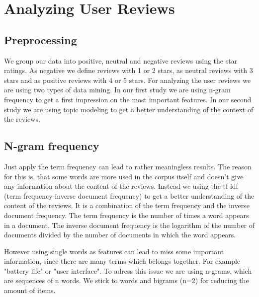 \section{Analyzing User Reviews}
\subsection{Preprocessing}
We group our data into positive, neutral and negative reviews using the star ratings.
As negative we define reviews with 1 or 2 stars, as neutral reviews with 3 stars and as positive reviews with 4 or 5 stars.
\label{sec:analyzing-user-reviews}
For analyzing the user reviews we are using two types of data mining.
In our first study we are using n-gram frequency to get a first impression on the most important features.
In our second study we are using topic modeling to get a better understanding of the context of the reviews.
\subsection{N-gram frequency}
\label{sec:n-gram-frequency}
Just apply the term frequency can lead to rather meaningless results.
The reason for this is, that some words are more used in the corpus itself and doesn't give any information about the content of the reviews.
Instead we using the tf-idf (term frequency-inverse document frequency) to get a better understanding of the content of the reviews.
It is a combination of the term frequency and the inverse document frequency.
The term frequency is the number of times a word appears in a document.
The inverse document frequency is the logarithm of the number of documents divided by the number of documents in which the word appears.

However using single words as features can lead to miss some important information, since there are many terms which belongs together. 
For example "battery life" or "user interface".
To adress this issue we are using n-grams, which are sequences of n words.
We stick to words and bigrams (n=2) for reducing the amount of items.

